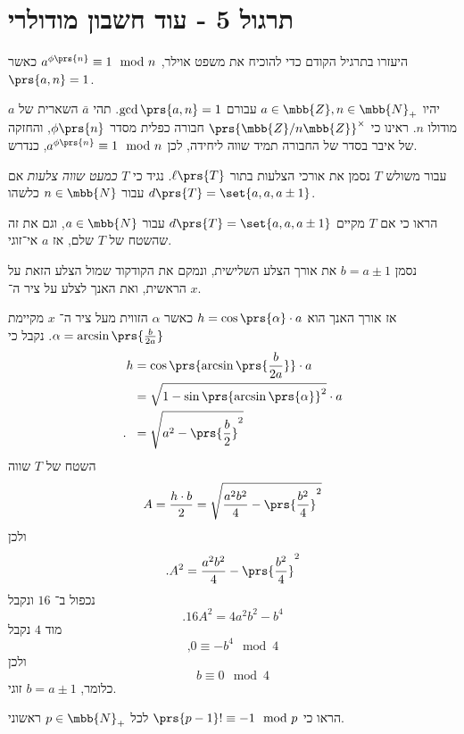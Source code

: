 \documentclass[a4paper,10pt,twoside,openany]{book}
\begin{document}
\chapter{תרגול 5 - עוד חשבון מודולרי}

\begin{exercisechap}
היעזרו בתרגיל הקודם כדי להוכיח את משפט אוילר,
$a^{\phi\prs{n}} \equiv 1 \mod{n}$
כאשר
$\prs{a,n} = 1$.
\end{exercisechap}

\begin{solution}
יהיו
$a \in \mbb{Z}, n \in \mbb{N}_+$
עבורם
$\gcd\prs{a,n} = 1$.
תהי
$\bar{a}$
השארית של
$a$
מודולו
$n$.
ראינו כי
$\prs{\mbb{Z} / n\mbb{Z}}^\times$
חבורה כפלית מסדר
$\phi\prs{n}$,
והחזקה של איבר בסדר של החבורה תמיד שווה ליחידה, לכן
$a^{\phi\prs{n}} \equiv 1 \mod{n}$,
כנדרש.
\end{solution}

\begin{exercisechap}
עבור משולש
$T$
נסמן את אורכי הצלעות בתור
$\ell\prs{T}$.
נגיד כי
$T$
\emph{כמעט שווה צלעות}
אם
$d\prs{T} = \set{a,a,a \pm 1}$
עבור
$n \in \mbb{N}$
כלשהו.

הראו כי אם
$T$
מקיים
$d\prs{T} = \set{a,a, a \pm 1}$
עבור
$a \in \mbb{N}$,
וגם את זה שהשטח של
$T$
שלם,
אז
$a$
אי־זוגי.
\end{exercisechap}

\begin{solution}
נסמן
$b = a \pm 1$
את אורך הצלע השלישית, ונמקם את הקודקוד שמול הצלע הזאת על הראשית, ואת האנך לצלע על ציר ה־%
$x$.

אז אורך האנך הוא
$h = \cos\prs{\alpha} \cdot a$
כאשר
$\alpha$
הזווית מעל ציר ה־%
$x$
מקיימת
$\alpha = \arcsin\prs{\frac{b}{2a}}$.
נקבל כי
\begin{align*}
h &= \cos\prs{\arcsin\prs{\frac{b}{2a}}} \cdot a
\\&= \sqrt{1 - \sin\prs{\arcsin\prs{\alpha}}^2} \cdot a
\\\text{.}\hphantom{h}&= \sqrt{a^2 - \prs{\frac{b}{2}}^2}
\end{align*}
השטח של
$T$
שווה
\[A = \frac{h \cdot b}{2} = \sqrt{\frac{a^2 b^2}{4} - \prs{\frac{b^2}{4}}^2}\]
ולכן
\[\text{.} A^2 = \frac{a^2 b^2}{4} - \prs{\frac{b^2}{4}}^2\]
נכפול ב־%
$16$
ונקבל
\[\text{.} 16 A^2 = 4 a^2 b^2 - b^4\]
מוד
$4$
נקבל
\[\text{,} 0 \equiv -b^4 \mod{4}\]
ולכן
\[b \equiv 0 \mod{4}\]
כלומר,
$b = a \pm 1$
זוגי.
\end{solution}

\begin{exercisechap}
הראו כי
$\prs{p-1}! \equiv -1 \mod{p}$
לכל
$p \in \mbb{N}_+$
ראשוני.
\end{exercisechap}
\end{document}
